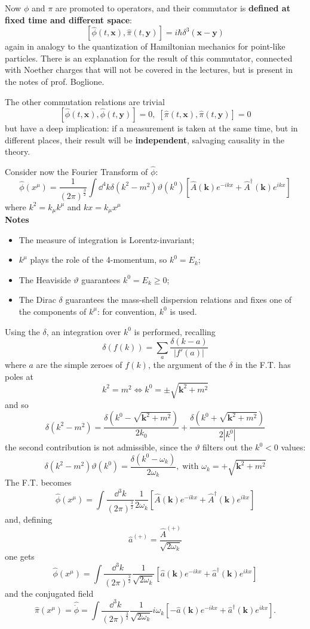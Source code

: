 Now $\phi$ and $\pi$ are promoted to operators, and their commutator is
\textbf{defined at fixed time and different space}:
$$\left[\hat \phi(t,\mathbf{x}),\hat \pi(t,\mathbf{y})\right]=
i\hbar\delta^3(\mathbf{x-y})$$
again in analogy to the quantization of Hamiltonian mechanics for point-like
particles. There is an explanation for the result of this commutator, connected
with Noether charges that will not be covered in the lectures, but is present
in the notes of prof. Boglione.

The other commutation relations are trivial
$$\left[\hat \phi(t,\mathbf{x}),\hat\phi(t,\mathbf{y})\right]=0,\;
\left[\hat\pi(t,\mathbf{x}),\hat\pi(t,\mathbf{y})\right]=0$$
but have a deep implication: if a measurement is taken at the same time, but
in different places, their result will be \textbf{independent}, salvaging
causality in the theory.

Consider now the Fourier Transform of $\hat\phi$:
$$\hat\phi(x^\mu) = \frac{1}{(2\pi)^\frac{3}{2}}\int \dd ^4k \delta(k^2-m^2)
\vartheta(k^0)\left[\hat A(\mathbf{k})e^{-ikx}+\hat A^\dagger(\mathbf{k})e^{ikx}\right]
$$
where $k^2=k_\mu k^\mu$ and $kx = k_\mu x^\mu$\\
\textbf{Notes}
\begin{itemize}
    \item The measure of integration is Lorentz-invariant;
    \item $k^\mu$ plays the role of the 4-momentum, so $k^0=E_k$;
    \item The Heaviside $\vartheta$ guarantees $k^0=E_k\geq0$;
    \item The Dirac $\delta$ guarantees the mass-shell dispersion
        relations and fixes one of the components of $k^\mu$: for
        convention, $k^0$ is used.
\end{itemize}
Using the $\delta$, an integration over $k^0$ is performed, recalling
$$\delta(f(k))=\sum_{a}^{}\frac{\delta(k-a)}{|f'(a)|}$$
where $a$ are the simple zeroes of $f(k)$, the argument of the $\delta$
in the F.T. has poles at
$$k^2=m^2\iff k^0 =\pm\sqrt{\mathbf{k}^2+m^2}$$
and so
$$\delta(k^2-m^2) = \frac{\delta(k^0-\sqrt{\mathbf{k}^2+m^2})}{2k_0} +
\frac{\delta(k^0+\sqrt{\mathbf{k}^2+m^2})}{2|k^0|}$$
the second contribution is not admissible, since the $\vartheta$ filters out
the $k^0<0$ values:
$$\delta(k^2-m^2)\vartheta(k^0) = \frac{\delta(k^0-\omega_k)}{2\omega_k},\;
\text{with }\omega_k=+\sqrt{\mathbf{k}^2+m^2}$$
The F.T. becomes
$$\hat\phi(x^\mu) = \int \frac{\dd^3k}{(2\pi)^\frac{3}{2}}\frac{1}{2\omega_k}
\left[\hat A(\mathbf{k})e^{-ikx}+\hat A^\dagger(\mathbf{k})e^{ikx}\right]$$
and, defining
$$\hat a^{(+)} = \frac{\hat A^{(+)}}{\sqrt{2\omega_k}}$$
one gets
$$\boxed{\hat\phi(x^\mu) = \int \frac{\dd^3k}{(2\pi)^\frac{3}{2}}\frac{1}
{\sqrt{2\omega_k}}\left[\hat a(\mathbf{k})e^{-ikx}+\hat a^\dagger(\mathbf{k})e^{ikx}
\right]}$$
and the conjugated field
$$\boxed{\hat\pi(x^\mu) = \hat{\dot\phi} =
\int \frac{\dd^3k}{(2\pi)^\frac{3}{2}}\frac{1}
{\sqrt{2\omega_k}}i\omega_k\left[-\hat a(\mathbf{k})e^{-ikx}+\hat a^\dagger(\mathbf{k})
e^{ikx}\right].}$$

